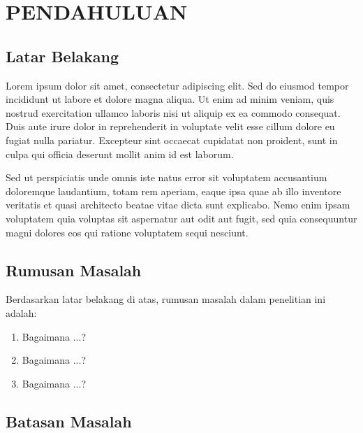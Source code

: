 \chapter{PENDAHULUAN}

\section{Latar Belakang}


Lorem ipsum dolor sit amet, consectetur adipiscing elit. Sed do eiusmod tempor incididunt ut labore et dolore magna aliqua. Ut enim ad minim veniam, quis nostrud exercitation ullamco laboris nisi ut aliquip ex ea commodo consequat. Duis aute irure dolor in reprehenderit in voluptate velit esse cillum dolore eu fugiat nulla pariatur. Excepteur sint occaecat cupidatat non proident, sunt in culpa qui officia deserunt mollit anim id est laborum.

Sed ut perspiciatis unde omnis iste natus error sit voluptatem accusantium doloremque laudantium, totam rem aperiam, eaque ipsa quae ab illo inventore veritatis et quasi architecto beatae vitae dicta sunt explicabo. Nemo enim ipsam voluptatem quia voluptas sit aspernatur aut odit aut fugit, sed quia consequuntur magni dolores eos qui ratione voluptatem sequi nesciunt.

\section{Rumusan Masalah}


Berdasarkan latar belakang di atas, rumusan masalah dalam penelitian ini adalah:

\begin{enumerate}
  \item Bagaimana ...?
  \item Bagaimana ...?
  \item Bagaimana ...?
\end{enumerate}

\section{Batasan Masalah}

